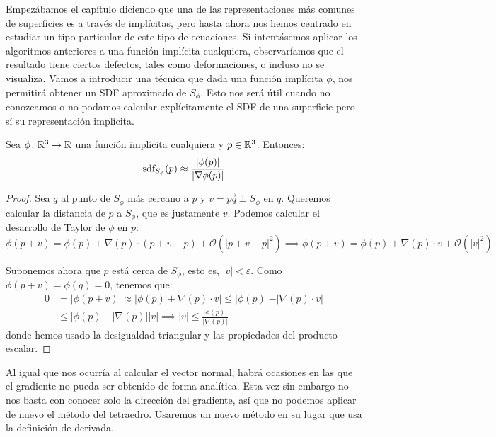 Empezábamos el capítulo diciendo que una de las representaciones más comunes de superficies es a través de implícitas, pero hasta ahora nos hemos centrado en estudiar un tipo particular de este tipo de ecuaciones. Si intentásemos aplicar los algoritmos anteriores a una función implícita cualquiera, observaríamos que el resultado tiene ciertos defectos, tales como deformaciones, o incluso no se visualiza. Vamos a introducir una técnica que dada una función implícita $\phi$, nos permitirá obtener un SDF aproximado de $S_\phi$. Esto nos será útil cuando no conozcamos o no podamos calcular explícitamente el SDF de una superficie pero sí su representación implícita.

\begin{proposicion}
    Sea $\phi\colon \mathbb{R}^3\to\mathbb{R}$ una función implícita cualquiera y $p\in\mathbb{R}^3$. Entonces: 
    \begin{equation*}    
        \text{sdf}_{S_\phi}(p) \approx \frac{\vert \phi(p)\vert}{\vert \nabla\phi(p)\vert}
    \end{equation*}
\end{proposicion}
\begin{proof}
    Sea $q$ al punto de $S_\phi$ más cercano a $p$ y $v=\vec{pq} \perp S_\phi$ en $q$. Queremos calcular la distancia de $p$ a $S_\phi$, que es justamente $v$. Podemos calcular el desarrollo de Taylor de $\phi$ en $p$:
    \begin{equation*}
        \phi(p+v) = \phi(p) + \nabla(p)\cdot (p+v-p) + \mathcal{O}(\vert p+v-p\vert^2) \implies \phi(p+v) = \phi(p) + \nabla(p)\cdot v + \mathcal{O}(\vert v\vert^2)
    \end{equation*}

    Suponemos ahora que $p$ está cerca de $S_\phi$, esto es, $\vert v\vert < \varepsilon$. Como $\phi(p+v) = \phi(q)=0$, tenemos que:
    \begin{align*}
        0 &= \vert \phi(p+v)\vert \approx \vert \phi(p) + \nabla(p)\cdot v \vert \le \vert \phi(p)\vert - \vert \nabla(p)\cdot v \vert\\
         &\le \vert \phi(p)\vert - \vert \nabla(p)\vert \vert v \vert \implies \vert v\vert \le \frac{\vert \phi(p)\vert}{\vert \nabla(p)\vert}
    \end{align*}
    donde hemos usado la desigualdad triangular y las propiedades del producto escalar.
\end{proof}

Al igual que nos ocurría al calcular el vector normal, habrá ocasiones en las que el gradiente no pueda ser obtenido de forma analítica. Esta vez sin embargo no nos basta con conocer solo la dirección del gradiente, así que no podemos aplicar de nuevo el método del tetraedro. Usaremos un nuevo método en su lugar que usa la definición de derivada.

